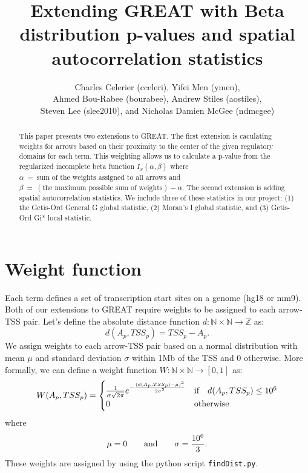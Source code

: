 \documentclass{article}
\title{Extending GREAT with Beta distribution p-values and spatial
autocorrelation statistics}
\author{Charles Celerier (cceleri), Yifei Men (ymen),\\
Ahmed Bou-Rabee (bourabee), Andrew Stiles (aostiles),\\
Steven Lee (slee2010), and Nicholas Damien McGee (ndmcgee)}
\def\zzz{\mathbb{Z}}
\def\nnn{\mathbb{N}}
\begin{document}
\maketitle

\begin{abstract}
  This paper presents two extensions to GREAT. The first extension is caculating
  weights for arrows based on their proximity to the center of the given
  regulatory domains for each term. This weighting allows us to calculate a
  p-value from the regularized incomplete beta function $I_x(\alpha, \beta)$
  where $\alpha~=~\text{sum of the weights assigned to all arrows}$ and
  $\beta~=~(\text{the maximum possible sum of weights}) - \alpha$. The second
  extension is adding spatial autocorrelation statistics. We include three of
  these statistics in our project: (1) the Getis-Ord General G global statistic, (2)
  Moran's I global statistic, and (3) Getis-Ord Gi* local statistic.
\end{abstract}

\section{Weight function}\label{sec:weightFunction}
Each term defines a set of transcription start sites on a genome (hg18 or mm9).
Both of our extensions to GREAT require weights to be assigned to each
arrow-TSS pair. Let's define the absolute distance function
$d:\nnn\times\nnn\rightarrow\zzz$ as:
\[
d(A_p,TSS_p) = TSS_p - A_p.
\]
We assign weights to each arrow-TSS pair based on a normal distribution with
mean $\mu$ and standard deviation $\sigma$ within 1Mb of the TSS and 0
otherwise. More formally, we can define a weight function
$W:\nnn\times\nnn\rightarrow[0,1]$ as:
\[
W(A_p,TSS_p) =
  \begin{cases}
    \frac{1}{\sigma\sqrt{2\pi}}e^{-\frac{(d(A_p, TSS_p)-\mu)^2}{2\sigma^2}} &
    \text{if\quad} d(A_p, TSS_p) \leq 10^6 \\
    0 & \text{otherwise}
  \end{cases}
\]
where
\[
\mu=0 \text{\qquad and\qquad} \sigma = \frac{10^6}{3}.
\]
These weights are assigned by using the python script {\tt findDist.py}.
\end{document}
